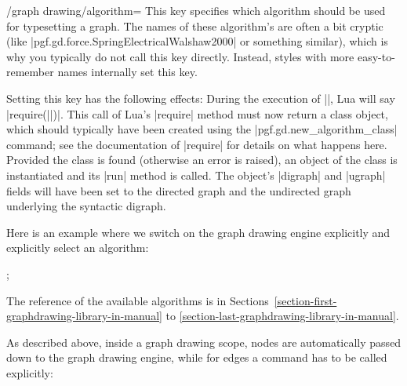 \begin{key}{/graph drawing/algorithm=}
  \label{section-gd-algorithm-key}%
  This key specifies which algorithm should be used for typesetting a
  graph. The names of these algorithm's are often a bit cryptic (like
  |pgf.gd.force.SpringElectricalWalshaw2000| or something similar),
  which is why you typically do not call this key directly. Instead,
  styles with more easy-to-remember names internally set this key.

  Setting this key has the following effects: During the execution of
  |\pgfgdendscope|, Lua will say |require(||)|.
  This call of Lua's |require| method must now return a class object,
  which should typically have been created using the
  |pgf.gd.new_algorithm_class| command; see the documentation of
  |require| for details on what happens here. Provided the class is
  found (otherwise an error is raised), an object of the class is
  instantiated and its |run| method is called. The object's |digraph|
  and |ugraph| fields will have been set to the directed graph and the
  undirected graph underlying the syntactic digraph.
  
  Here is an example where we switch on the graph drawing engine
  explicitly and explicitly select an algorithm:
\begin{codeexample}[]
\tikz [graph drawing scope,
       /graph drawing/algorithm=pgf.gd.force.SpringElectricalWalshaw2000]
  ;  
\end{codeexample}
  The reference of the available algorithms is in
  Sections~\ref{section-first-graphdrawing-library-in-manual} to 
  \ref{section-last-graphdrawing-library-in-manual}.
\end{key}

As described above, inside a graph drawing scope, nodes are
automatically passed down to the graph drawing engine, while for edges
a command has to be called explicitly:

